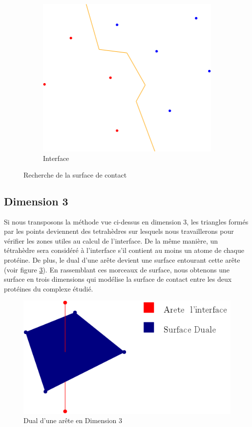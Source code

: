 \begin{figure}[ht]
\begin{subfigure}{0.45\textwidth}
  \includegraphics[width=\textwidth]{figures/process_d_4.png}
  \caption{Interface}
  \label{fig::process_d_4}
\end{subfigure}
\caption{Recherche de la surface de contact}
\label{fig::delaunays_process_2}
\end{figure}


\subsection*{Dimension 3}

Si nous transposons la méthode vue ci-dessus en dimension 3, les triangles formés
par les points deviennent des tetrahèdres sur lesquels nous travaillerons pour vérifier
les zones utiles au calcul de l'interface. De la même manière, un tétrahèdre sera considéré
à l'interface s'il contient au moins un atome de chaque protéine.
De plus, le dual d'une arête devient une surface entourant cette arête (voir figure
 \ref{fig::dual_3d}). En rassemblant ces morceaux
de surface, nous obtenons une surface en trois dimensions qui modélise la surface
de contact entre les deux protéines du complexe étudié.

\begin{figure}[ht]
\centering
  \includegraphics[width=\textwidth]{figures/dual_3d.png}
  \caption{Dual d'une arête en Dimension 3}
  \label{fig::dual_3d}
\end{figure}

